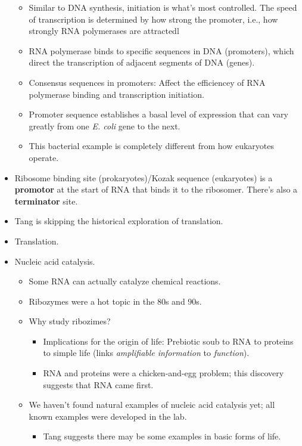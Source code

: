 \documentclass[../notes.tex]{subfiles}
\begin{document}
\begin{itemize}
\begin{itemize}
        \item Similar to DNA synthesis, initiation is what's most controlled. The speed of transcription is determined by how strong the promoter, i.e., how strongly RNA polymerases are attractedl
        \item RNA polymerase binds to specific sequences in DNA (promoters), which direct the transcription of adjacent segments of DNA (genes).
        \item Consensus sequences in promoters: Affect the efficiencey of RNA polymerase binding and transcription initiation.
        \item Promoter sequence establishes a basal level of expression that can vary greatly from one \emph{E. coli} gene to the next.
        \item This bacterial example is completely different from how eukaryotes operate.
    \end{itemize}
    \item Ribosome binding site (prokaryotes)/Kozak sequence (eukaryotes) is a \textbf{promotor} at the start of RNA that binds it to the ribosomer. There's also a \textbf{terminator} site.
    \item Tang is skipping the historical exploration of translation.
    \item Translation.
    \item Nucleic acid catalysis.
    \begin{itemize}
        \item Some RNA can actually catalyze chemical reactions.
        \item Ribozymes were a hot topic in the 80s and 90s.
        \item Why study ribozimes?
        \begin{itemize}
            \item Implications for the origin of life: Prebiotic soub to RNA to proteins to simple life (links \emph{amplifiable information} to \emph{function}).
            \item RNA and proteins were a chicken-and-egg problem; this discovery suggests that RNA came first.
        \end{itemize}
        \item We haven't found natural examples of nucleic acid catalysis yet; all known examples were developed in the lab.
        \begin{itemize}
            \item Tang suggests there may be some examples in basic forms of life.

\end{itemize}
\end{itemize}
\end{itemize}
\end{document}
